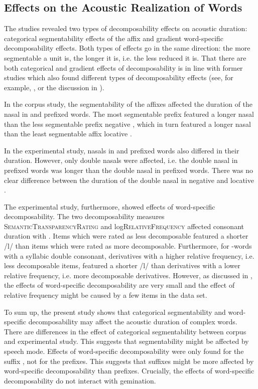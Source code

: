 \subsection{Effects on the Acoustic Realization of Words}

The studies revealed two types of decomposability effects on acoustic duration: categorical segmentability effects of the affix and gradient word-specific decomposability effects. Both types of effects go in the same direction: the more segmentable a unit is, the  longer it is, i.e. the less reduced it is. That there are both categorical and gradient effects of decomposability is in line with former studies which also found different types of decomposability effects (see, for example, \cite{Schuppler.2012}, or the discussion in ). 

In the corpus study, the segmentability of the affixes affected the duration of the nasal in  and prefixed words. The most segmentable prefix  featured a longer nasal than the less segmentable prefix negative , which in turn featured a longer nasal than the least segmentable affix locative . 


In the experimental study, nasals in  and prefixed words also differed in their duration. However, only double nasals were affected, i.e. the double nasal in prefixed words was longer than the double nasal in prefixed words. There was no clear difference between the duration of the double nasal in negative and locative .

The experimental study, furthermore, showed effects of word-specific decomposability. The two decomposability measures \textsc{SemanticTransparencyRating} and log\textsc{RelativeFrequency} affected consonant duration with . Items which were rated as less decomposable featured a shorter /l/ than items which were rated as more decomposable. Furthermore, for -words with a syllabic double consonant, derivatives with a higher relative frequency, i.e. less decomposable items, featured a shorter /l/ than derivatives with a lower relative frequency, i.e. more decomposable derivatives. However, as discussed in , the effects of word-specific decomposability are very small and the effect of relative frequency might be caused by a few items in the data set. 


To sum up, the present study shows that categorical segmentability and word-specific decomposability may affect the acoustic duration of complex words.
 There are differences in the effect of categorical segmentability between corpus and experimental study. This suggests
that segmentability might be affected by speech mode. 
Effects of word-specific decomposability were only found for the suffix , not for the prefixes. This suggests that suffixes might be more affected by word-specific decomposability than prefixes.
 Crucially, the effects of word-specific decomposability do not interact with gemination. 




